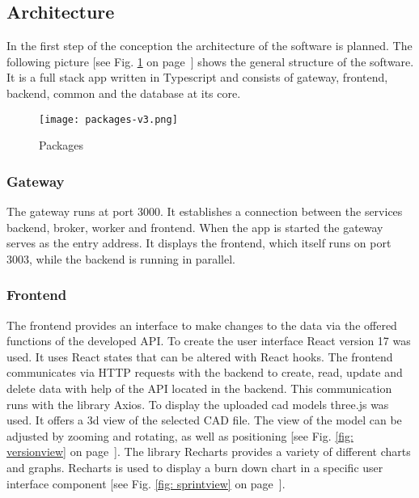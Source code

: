     \subsection*{Architecture}
    In the first step of the conception the architecture of the software is planned. The following picture [see Fig. \ref{fig: packages} on page~\pageref{fig: packages}] shows the general structure of the software. It is a full stack app written in Typescript and consists of gateway, frontend, backend, common and the database at its core. 
    
    \begin{figure}[h]
        \centering
        \texttt{[image: packages-v3.png]}
        \caption{Packages}
        \label{fig: packages}
    \end{figure}

    \subsubsection*{Gateway}
    The gateway runs at port 3000. It establishes a connection between the services backend, broker, worker and frontend. When the app is started the gateway serves as the entry address. It displays the frontend, which itself runs on port 3003, while the backend is running in parallel. 
  
    \subsubsection*{Frontend}
    The frontend provides an interface to make changes to the data via the offered functions of the developed API. To create the user interface React version 17 was used. It uses React states that can be altered with React hooks. The frontend communicates via HTTP requests with the backend to create, read, update and delete data with help of the API located in the backend. This communication runs with the library Axios. To display the uploaded cad models three.js was used. It offers a 3d view of the selected CAD file. The view of the model can be adjusted by zooming and rotating, as well as positioning [see Fig. \ref{fig: versionview} on page~\pageref{fig: versionview}]. The library Recharts provides a variety of different charts and graphs. Recharts is used to display a burn down chart in a specific user interface component [see Fig. \ref{fig: sprintview} on page~\pageref{fig: sprintview}].

